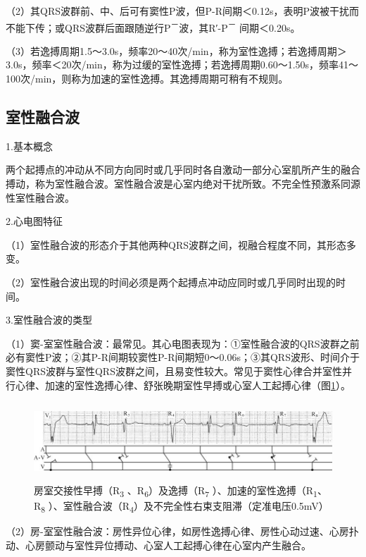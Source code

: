 （2）其QRS波群前、中、后可有窦性P波，但P-R间期＜0.12s，表明P波被干扰而不能下传；或QRS波群后面跟随逆行P\textsuperscript{－}波，其R′-P\textsuperscript{－} 间期＜0.20s。

（3）若逸搏周期1.5～3.0s，频率20～40次/min，称为室性逸搏；若逸搏周期＞3.0s，频率＜20次/min，称为过缓的室性逸搏；若逸搏周期0.60～1.50s，频率41～100次/min，则称为加速的室性逸搏。其逸搏周期可稍有不规则。

\protect\hypertarget{text00009.htmlux5cux23subid61}{}{}

\subsection{室性融合波}

1.基本概念

两个起搏点的冲动从不同方向同时或几乎同时各自激动一部分心室肌所产生的融合搏动，称为室性融合波。室性融合波是心室内绝对干扰所致。不完全性预激系同源性室性融合波。

2.心电图特征

（1）室性融合波的形态介于其他两种QRS波群之间，视融合程度不同，其形态多变。

（2）室性融合波出现的时间必须是两个起搏点冲动应同时或几乎同时出现的时间。

3.室性融合波的类型

（1）窦-室室性融合波：最常见。其心电图表现为：①室性融合波的QRS波群之前必有窦性P波；②其P-R间期较窦性P-R间期短0～0.06s；③其QRS波形、时间介于窦性QRS波群与室性QRS波群之间，且易变性较大。常见于窦性心律合并室性并行心律、加速的室性逸搏心律、舒张晚期室性早搏或心室人工起搏心律（图\ref{fig3-17}）。

\begin{figure}[!htbp]
 \centering
 \includegraphics[width=5.78125in,height=1.15625in]{./images/Image00067.jpg}
 \captionsetup{justification=centering}
 \caption{房室交接性早搏（R\textsubscript{3} 、R\textsubscript{6}）及逸搏（R\textsubscript{7} ）、加速的室性逸搏（R\textsubscript{1}、R\textsubscript{8} ）、室性融合波（R\textsubscript{4}）及不完全性右束支阻滞（定准电压0.5mV）}
 \label{fig3-17}
  \end{figure} 

（2）房-室室性融合波：房性异位心律，如房性逸搏心律、房性心动过速、心房扑动、心房颤动与室性异位搏动、心室人工起搏心律在心室内产生融合。

